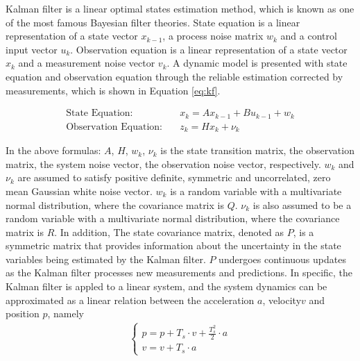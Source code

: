 Kalman filter is a linear optimal states estimation method, which is known as one of the most famous Bayesian filter theories. State equation is a linear representation of a state vector $x_{k-1}$, a process noise matrix $w_{k}$ and a control input vector $u_{k}$. Observation equation is a linear representation of a state vector $x_{k}$ and a measurement noise vector $v_{k}$. A dynamic model is presented with state equation and observation equation through the reliable estimation corrected by measurements, which is shown in Equation \ref{eq:kf}.

\begin{equation}
    \begin{aligned}
        \text{State Equation:} \quad & x_{k} = A x_{k-1} + B u_{k-1} + w_{k} \\
        \text{Observation Equation:} \quad & z_{k} = H x_{k} + \nu_{k}
    \end{aligned}
\label{eq:kf}
\end{equation}

In the above formulas: $A$, $H$, $w_{k}$, $\nu_{k}$ is the state transition matrix, the observation matrix, the system noise vector, the observation noise vector, respectively. $w_{k}$ and $\nu_{k}$ are assumed to satisfy positive definite, symmetric and uncorrelated, zero mean Gaussian white noise vector. $w_{k}$ is a random variable with a multivariate normal distribution, where the covariance matrix is $Q$. $\nu_{k}$ is also assumed to be a random variable with a multivariate normal distribution, where the covariance matrix is $R$. In addition, The state covariance matrix, denoted as $P$, is a symmetric matrix that provides information about the uncertainty in the state variables being estimated by the Kalman filter. $P$ undergoes continuous updates as the Kalman filter processes new measurements and predictions. In specific, the Kalman filter is appled to a linear system, and the system dynamics can be approximated as a linear relation between the acceleration $a$, velocity$v$ and position $p$, namely 
\begin{align*}
    \begin{cases} 
    p = p + T_s\cdot v + \frac{T_s^2}{2}\cdot a\\
    v = v + T_s\cdot a
    \end{cases}
    \label{eq:kf_dynamics}
\end{align*}


